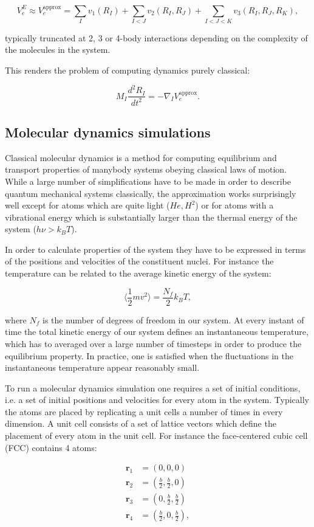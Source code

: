 $$ V_e^E \approx V_e^{\text{approx}} =
    \sum_I v_1(R_I) + \sum_{I < J} v_2(R_I, R_J)
    + \sum_{I < J < K} v_3(R_I, R_J, R_K) , $$

typically truncated at 2, 3 or 4-body interactions
depending on the complexity of the molecules in the system.
\par
This renders the problem of computing dynamics purely classical:

$$ M_I \frac{d^2 R_I}{dt^2} = -\nabla_I V_e^{\text{approx}} . $$

\subsection{Molecular dynamics simulations}
Classical molecular dynamics is a method
for computing equilibrium and transport properties
of manybody systems obeying classical laws of motion.
While a large number of simplifications have to be made
in order to describe quantum mechanical systems classically,
the approximation works surprisingly well
except for atoms which are quite light ($He, H^2$)
or for atoms with a vibrational energy
which is substantially larger than the thermal energy
of the system ($h\nu > k_B T$).
\par
In order to calculate properties of the system
they have to be expressed in terms of the positions
and velocities of the constituent nuclei.
For instance the temperature can be related
to the average kinetic energy of the system:

$$ \langle \frac{1}{2} m v^2 \rangle = \frac{N_f}{2} k_B T , $$

where $N_f$ is the number of degrees of freedom in our system.
At every instant of time the total kinetic energy
of our system defines an instantaneous temperature,
which has to averaged over a large number of timesteps
in order to produce the equilibrium property.
In practice, one is satisfied when the fluctuations
in the instantaneous temperature appear reasonably small.
\par
To run a molecular dynamics simulation one requires
a set of initial conditions, i.e. a set of initial positions and velocities
for every atom in the system. Typically the atoms
are placed by replicating a unit cells a number of times
in every dimension. A unit cell consists of a set
of lattice vectors which define the placement of every atom in the
unit cell. For instance the face-centered cubic cell (FCC)
contains 4 atoms:

\begin{equation}
    \begin{split}
        \bm{r}_1 &= (0, 0, 0) \\
        \bm{r}_2 &= (\frac{b}{2}, \frac{b}{2}, 0) \\
        \bm{r}_3 &= (0, \frac{b}{2}, \frac{b}{2}) \\
        \bm{r}_4 &= (\frac{b}{2}, 0, \frac{b}{2}) , \\
    \end{split}
\end{equation}

